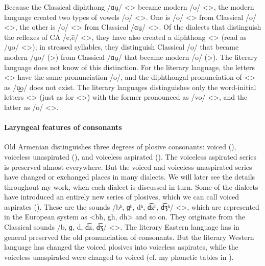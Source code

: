 Because the Classical diphthong /ɑu̯/ <> became modern /o/ <>, the modern language created two types of vowels /o/ <>. One is /o/ <> from Classical /o/ <>, the other is /o/ <> from Classical /ɑu̯/ <>. Of the dialects that distinguish the reflexes of CA /e,ē/ <>, they have also created a diphthong <> (read as /u̯o/ <>); in stressed syllables, they distinguish Classical /o/ that became modern /u̯o/ (>) from Classical /ɑu̯/ that became modern /o/ (>). The literary language does not know of this distinction. For the literary language, the letters <> have the same pronunciation /o/, and the diphthongal pronunciation of <> as /u͜o/ does not exist. The literary languages distinguishes only the word-initial letters <> (just as for <>) with the former pronounced as /vo/ <>, and the latter as /o/ <>. 




\begin{adjarianpage}\label{page:17}\end{adjarianpage}%

\paragraph{Laryngeal features of consonants}
Old Armenian distinguishes three degrees of plosive consonants: voiced (), voiceless unaspirated (), and voiceless aspirated (). The voiceless aspirated series is preserved almost everywhere. But the voiced and voiceless unaspirated series have changed or exchanged places in many dialects. We will later see the details throughout my work, when each dialect is discussed in turn. Some of the dialects have introduced an entirely new series of plosives, which we can call voiced aspirates (). These are the sounds /bʰ, ɡʰ, dʰ, d͡zʰ, d͡ʒʰ/ <>, which are represented in the European system as <bh, gh, dh> and so on. They originate from the Classical sounds /b, ɡ, d, d͡z, d͡ʒ/ <>. The literary Eastern language has in general preserved the old pronunciation of consonants. But the literary Western language has changed the voiced plosives into voiceless aspirates, while the voiceless unaspirated were changed to voiced (cf. my phonetic tables in \citealt{Adjarian-1899-ArmenianExplosives}). 

